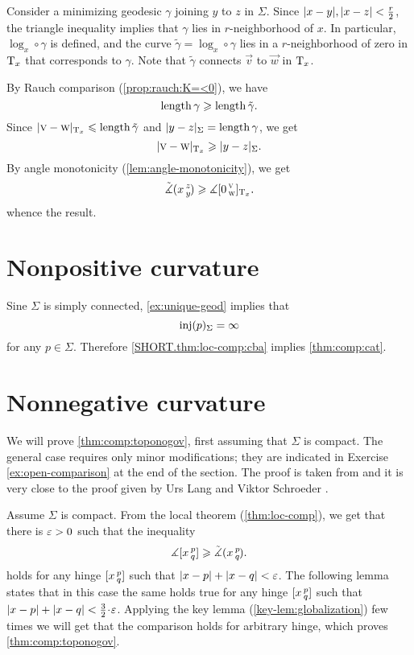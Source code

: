 Consider a minimizing geodesic $\gamma$ joining $y$ to $z$ in $\Sigma$.
Since $|x\z-y|,|x\z-z|\z<\tfrac r2$, the triangle inequality implies that $\gamma$ lies in $r$-neighborhood of $x$.
In particular, $\log_x\circ\gamma$ is defined, and the curve
$\tilde \gamma=\log_x\circ\gamma$ lies in a $r$-neighborhood of zero in $\mathrm{T}_x$ that corresponds to $\gamma$.
Note that $\tilde\gamma$ connects $\vec v$ to $\vec w$ in $\mathrm{T}_x$.

By Rauch comparison (\ref{prop:rauch:K=<0}), we have
\[\mathop{\rm length}\nolimits\gamma\geqslant \mathop{\rm length}\nolimits \tilde \gamma.\]
Since $|\text{\sc{v}}-\text{\sc{w}}|_{\mathrm{T}_x}\leqslant\mathop{\rm length}\nolimits\tilde \gamma$ and $|y-z|_{\Sigma}= \mathop{\rm length}\nolimits\gamma$, we get 
\[|\text{\sc{v}}-\text{\sc{w}}|_{\mathrm{T}_x}\geqslant |y-z|_\Sigma.\]
By angle monotonicity (\ref{lem:angle-monotonicity}), we get
\[\tilde\measuredangle(x\,{}^{z}_{y}\hspace{-0.2ex})\geqslant\measuredangle[0\,{}^{\text{\sc{v}}}_{\text{\sc{w}}}]_{\mathrm{T}_x}.\]
whence the result.
\qeds

\section{Nonpositive curvature}\label{sec:nonpos-comp}

Sine $\Sigma$ is simply connected, \ref{ex:unique-geod} implies that 
\[\mathop{\rm inj}\nolimits(p)_\Sigma=\infty\]
for any $p\in\Sigma$.
Therefore \ref{SHORT.thm:loc-comp:cba} implies \ref{thm:comp:cat}.
\qeds

\section{Nonnegative curvature}\label{sec:nonneg-comp}

We will prove \ref{thm:comp:toponogov}, first assuming that $\Sigma$ is compact.
The general case requires only minor modifications; they are indicated in Exercise \ref{ex:open-comparison} at the end of the section.
The proof is taken from \cite{alexander-kapovitch-petrunin2027} and it is very close to the proof given by Urs Lang and Viktor Schroeder \cite{lang-schroeder}.

\label{proof(thm:comp:toponogov)}
Assume $\Sigma$ is compact. 
From the local theorem (\ref{thm:loc-comp}), we get that there is $\varepsilon>0$ such that the inequality 
\[\measuredangle[x\,{}^{p}_{q}]\geqslant\tilde\measuredangle(x\,{}^{p}_{q}\hspace{-0.2ex}).\]
holds for any hinge $[x\,{}^{p}_{q}]$ such that $|x-p|+|x-q|<\varepsilon$.
The following lemma states that in this case the same holds true for any hinge $[x\,{}^{p}_{q}]$ such that $|x-p|+|x-q|<\tfrac32\cdot\eps$.
Applying the key lemma (\ref{key-lem:globalization}) few times we will get that the comparison holds for arbitrary hinge, which proves \mbox{\ref{thm:comp:toponogov}}.
\qeds

